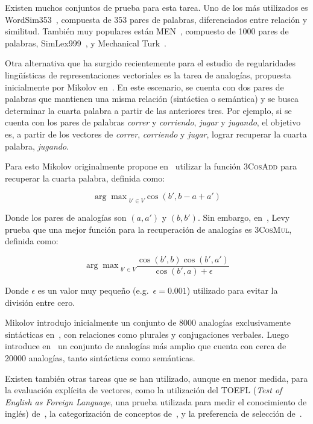 Existen muchos conjuntos de prueba para esta tarea. Uno de los más utilizados es
WordSim353~\cite{Finkelstein2002}, compuesta de 353 pares de palabras, diferenciados entre relación
y similitud. También muy populares están MEN~\cite{Bruni2012}, compuesto de 1000 pares de palabras,
SimLex999~\cite{Hill2014}, y Mechanical Turk~\cite{Radinsky2011}.

Otra alternativa que ha surgido recientemente para el estudio de regularidades lingüísticas de
representaciones vectoriales es la tarea de analogías, propuesta inicialmente por Mikolov
en~\cite{Mikolov2013a}. En este escenario, se cuenta con dos pares de palabras que mantienen una
misma relación (sintáctica o semántica) y se busca determinar la cuarta palabra a partir de las
anteriores tres. Por ejemplo, si se cuenta con los pares de palabras \textit{correr} y
\textit{corriendo}, \textit{jugar} y \textit{jugando}, el objetivo es, a partir de los vectores de
\textit{correr}, \textit{corriendo} y \textit{jugar}, lograr recuperar la cuarta palabra,
\textit{jugando}.

Para esto Mikolov originalmente propone en~\cite{Mikolov2013a} utilizar la función \textsc{3CosAdd}
para recuperar la cuarta palabra, definida como:

\[
  {\arg \max}_{b' \in V} \cos(b', b - a + a')
\]

Donde los pares de analogías son $(a, a')$ y $(b, b')$. Sin embargo, en~\cite{Levy2014b}, Levy
prueba que una mejor función para la recuperación de analogías es \textsc{3CosMul}, definida como:

\[
  {\arg \max}_{b' \in V} \frac{\cos(b', b) \cos(b', a')}{\cos(b', a) + \epsilon}
\]

Donde $\epsilon$ es un valor muy pequeño (e.g.\ $\epsilon = 0.001$) utilizado para evitar la
división entre cero.

Mikolov introdujo inicialmente un conjunto de 8000 analogías exclusivamente sintácticas
en~\cite{Mikolov2013a}, con relaciones como plurales y conjugaciones verbales. Luego introduce
en~\cite{Mikolov2013b} un conjunto de analogías más amplio que cuenta con cerca de 20000 analogías,
tanto sintácticas como semánticas.

Existen también otras tareas que se han utilizado, aunque en menor medida, para la evaluación
explícita de vectores, como la utilización del TOEFL (\textit{Test of English as Foreign Language},
una prueba utilizada para medir el conocimiento de inglés) de~\cite{LandauerDumais1997}, la
categorización de conceptos de~\cite{Almuhareb2006}, y la preferencia de selección
de~\cite{Pado2007}.


